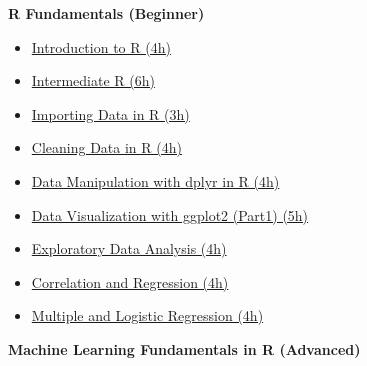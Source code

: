 \documentclass[
  11pt,
]{article}
\providecommand{\tightlist}{%
  \setlength{\itemsep}{0pt}\setlength{\parskip}{0pt}}
\newenvironment{tips}[1]
  {
  \begin{itemize}
  \footnotesize
  \renewcommand{\labelitemi}{
    \raisebox{-.7\height}[0pt][0pt]{
      {\setkeys{Gin}{width=3em,keepaspectratio}
        \texttt{[image: images/\#1.png]}}
    }
  }
  \setlength{\fboxsep}{1em}
  \begin{rbox}
  \item
  }
  {
  \end{rbox}
  \end{itemize}
  }
\begin{document}
\begin{tips}r

\textbf{R Fundamentals (Beginner)}

\begin{itemize}
\tightlist
\item
  \href{https://www.datacamp.com/courses/free-introduction-to-r}{Introduction to R (4h)}
\item
  \href{https://www.datacamp.com/courses/intermediate-r}{Intermediate R (6h)}
\item
  \href{https://www.datacamp.com/courses/importing-data-in-r-part-1}{Importing Data in R (3h)}
\item
  \href{https://www.datacamp.com/courses/cleaning-data-in-r}{Cleaning Data in R (4h)}
\item
  \href{https://www.datacamp.com/courses/data-manipulation-with-dplyr-in-r}{Data Manipulation with dplyr in R (4h)}
\item
  \href{https://www.datacamp.com/courses/data-visualization-with-ggplot2-1}{Data Visualization with ggplot2 (Part1) (5h)}
\item
  \href{https://www.datacamp.com/courses/exploratory-data-analysis}{Exploratory Data Analysis (4h)}
\item
  \href{https://www.datacamp.com/courses/correlation-and-regression}{Correlation and Regression (4h)}
\item
  \href{https://www.datacamp.com/courses/multiple-and-logistic-regression}{Multiple and Logistic Regression (4h)}
\end{itemize}

\textbf{Machine Learning Fundamentals in R (Advanced)}


\end{tips}
\end{document}
